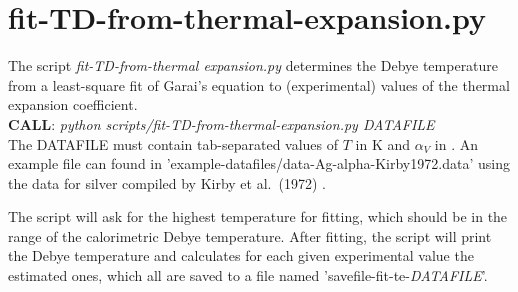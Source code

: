 %
\section{fit-TD-from-thermal-expansion.py}
The script \emph{fit-TD-from-thermal expansion.py} determines the Debye temperature from a least-square fit of Garai's equation \cite{Garai2006} to (experimental) values of the thermal expansion coefficient.\\

\textbf{CALL}: \emph{python scripts/fit-TD-from-thermal-expansion.py DATAFILE}\\

The DATAFILE must contain tab-separated values of $T$ in K and $\alpha_V$ in . An example file can found in 'example-datafiles/data-Ag-alpha-Kirby1972.data' using the data for silver compiled by Kirby et al.~(1972) \cite{Kirby1972}.

The script will ask for the highest temperature for fitting, which should be in the range of the calorimetric Debye temperature. After fitting, the script will print the Debye temperature and calculates for each given experimental value the estimated ones, which all are saved to a file named 'savefile-fit-te-\emph{DATAFILE}'.
